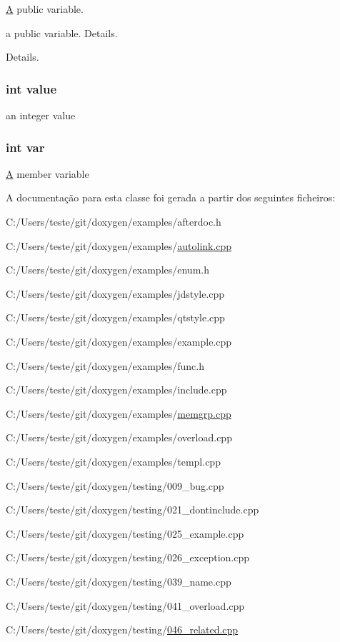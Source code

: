 \hyperlink{class_a}{A} public variable. 

a public variable. Details.

Details. \hypertarget{class_test_ac4f474c82e82cbb89ca7c36dd52be0ed}{
\subsubsection[{value}]{\setlength{\rightskip}{0pt plus 5cm}int value\hspace{0.3cm}{\ttfamily [protected]}}}\label{class_test_ac4f474c82e82cbb89ca7c36dd52be0ed}
an integer value \hypertarget{class_test_a96c77f9f3a7baec84b9b8add26a31787}{
\subsubsection[{var}]{\setlength{\rightskip}{0pt plus 5cm}int var\hspace{0.3cm}{\ttfamily [protected]}}}\label{class_test_a96c77f9f3a7baec84b9b8add26a31787}
\hyperlink{class_a}{A} member variable 

A documentação para esta classe foi gerada a partir dos seguintes ficheiros\-:\begin{DoxyCompactItemize}
\item 
C\-:/\-Users/teste/git/doxygen/examples/afterdoc.\-h\item 
C\-:/\-Users/teste/git/doxygen/examples/\hyperlink{autolink_8cpp}{autolink.\-cpp}\item 
C\-:/\-Users/teste/git/doxygen/examples/enum.\-h\item 
C\-:/\-Users/teste/git/doxygen/examples/jdstyle.\-cpp\item 
C\-:/\-Users/teste/git/doxygen/examples/qtstyle.\-cpp\item 
C\-:/\-Users/teste/git/doxygen/examples/example.\-cpp\item 
C\-:/\-Users/teste/git/doxygen/examples/func.\-h\item 
C\-:/\-Users/teste/git/doxygen/examples/include.\-cpp\item 
C\-:/\-Users/teste/git/doxygen/examples/\hyperlink{memgrp_8cpp}{memgrp.\-cpp}\item 
C\-:/\-Users/teste/git/doxygen/examples/overload.\-cpp\item 
C\-:/\-Users/teste/git/doxygen/examples/templ.\-cpp\item 
C\-:/\-Users/teste/git/doxygen/testing/009\-\_\-bug.\-cpp\item 
C\-:/\-Users/teste/git/doxygen/testing/021\-\_\-dontinclude.\-cpp\item 
C\-:/\-Users/teste/git/doxygen/testing/025\-\_\-example.\-cpp\item 
C\-:/\-Users/teste/git/doxygen/testing/026\-\_\-exception.\-cpp\item 
C\-:/\-Users/teste/git/doxygen/testing/039\-\_\-name.\-cpp\item 
C\-:/\-Users/teste/git/doxygen/testing/041\-\_\-overload.\-cpp\item 
C\-:/\-Users/teste/git/doxygen/testing/\hyperlink{046__related_8cpp}{046\-\_\-related.\-cpp}\end{DoxyCompactItemize}
